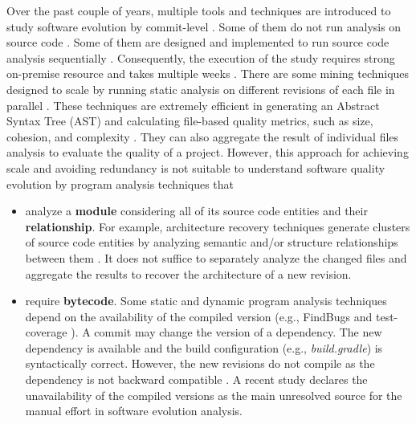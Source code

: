 Over the past couple of years, multiple tools and techniques are introduced to study software evolution by commit-level \citep{Tufano2017TSE,Dyer2015TOSEM,diamantopoulos2016qualboa,Tiwari2017msr,PINTO201559,gousios2014lean,Rozenberg2016MSR,Kaur2018,Sokol2013SCAM,Trautsch2017,Trautsch:2016:APE:2901739.2901753}.
Some of them do not run analysis on source code \citep{gousios2014lean,Rozenberg2016MSR}. 
Some of them are designed and implemented to run source code analysis sequentially \citep{Tufano2017TSE,Sokol2013SCAM}.
Consequently, the execution of the study requires strong on-premise resource and takes multiple weeks \citep{Tufano2017TSE}.
There are some mining techniques designed to scale by running static analysis on different revisions of each file in parallel \citep{Dyer2015TOSEM,AlexandruSANER2017,Trautsch2017}.
These techniques are extremely efficient in generating an Abstract Syntax Tree (AST) \citep{AlexandruSANER2017,Dyer2015TOSEM} and calculating file-based quality metrics, such as size, cohesion, and complexity \citep{Trautsch2017}.
They can also aggregate the result of individual files analysis to evaluate the quality of a project.
However, this approach for achieving scale and avoiding redundancy is not suitable to understand software quality evolution by program analysis techniques that
\begin{itemize}
	\item analyze a \textbf{module} considering all of its source code entities and their \textbf{relationship}.
	For example, architecture recovery techniques generate clusters of source code entities by analyzing semantic and/or structure relationships between them \citep{garcia2013comparative,Tzerpos:2000:AAC:832307.837118}.
	It does not suffice to separately analyze the changed files and aggregate the results to recover the architecture of a new revision.
	\item require \textbf{bytecode}.
	Some static and dynamic program analysis techniques depend on the availability of the compiled version (e.g., FindBugs \citep{4602670} and test-coverage \citep{Malaiya2002ieee}). 
	A commit may change the version of a dependency. 
	The new dependency is available and the build configuration (e.g., \textit{build.gradle}) is syntactically correct.
	However, the new revisions do not compile as the dependency is not backward compatible \citep{Behnamghader2017qrs}.
	A recent study \citep{AlexandruSANER2017} declares the unavailability of the compiled versions as the main unresolved source for the manual effort in software evolution analysis.
\end{itemize}

